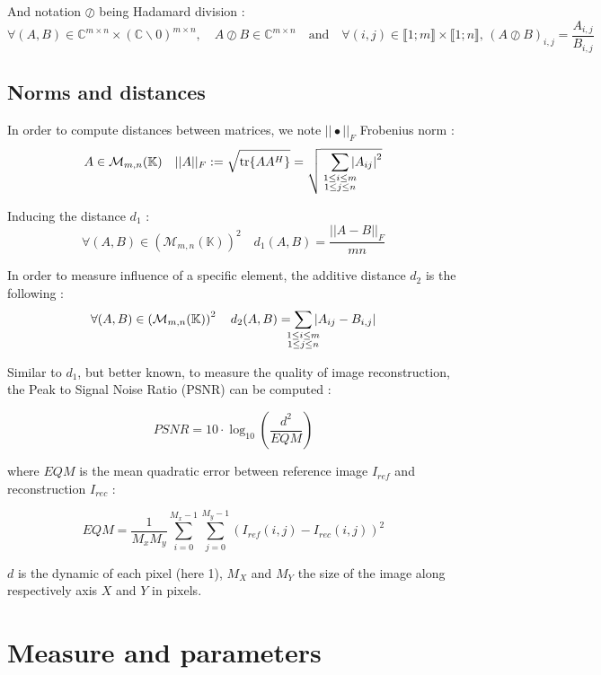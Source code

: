 \documentclass[titlepage,11pt]{article}
\newcommand{\fnorm}[1]{|\vert#1|\vert_{F}} %
\begin{document}
	And notation $\oslash$ being Hadamard division :
	$$
	\forall (A,B)\in\mathbb{C}^{m\times n}\times\left(\mathbb{C}\backslash0\right)^{m\times n}, \quad A\oslash B\in\mathbb{C}^{m\times n} \quad\text{and}\quad \forall (i,j)\in\llbracket1;m\rrbracket\times\llbracket1;n\rrbracket,\, (A\oslash B)_{i,j} = \frac{A_{i,j}}{B_{i,j}}
	$$
	
	\subsection{Norms and distances}
	
	In order to compute distances between matrices, we note $\fnorm{\bullet}$ Frobenius norm :
	$$
	A\in\mathcal{M}_{m,n}(\mathbb{K}) \quad \fnorm{A} := \sqrt{\tr{AA^H}} = \sqrt{
		\;\;\;\sum_{
			\mathclap{
				\substack{
					1\le i\le m \\1\le j\le n
				}
			}
		}\abs{A_{ij}}^2}
	$$
	
	Inducing the distance $d_1$ :
	$$
	\forall(A,B)\in\left(\mathcal{M}_{m,n}(\mathbb{K})\right)^2\quad d_1(A,B) = \frac{\fnorm{A-B}}{mn}
	$$
	
	In order to measure influence of a specific element, the additive distance $d_2$ is the following :
	$$
	\forall(A,B)\in\left(\mathcal{M}_{m,n}(\mathbb{K})\right)^2\quad d_2(A,B) = \sum_{
		\mathclap{
			\substack{
				1\le i\le m \\1\le j\le n
			}
		}
	}\abs{A_{ij} - B_{i,j}}
	$$
	
	Similar to $d_1$, but better known, to measure the quality of image reconstruction, the Peak to Signal Noise Ratio (PSNR) can be computed :
	
	$$
		PSNR = 10\cdot\log_{10}\left(\frac{d^2}{EQM}\right)
	$$
	
	where $EQM$ is the mean quadratic error between reference image $I_{ref}$ and reconstruction $I_{rec}$ :
	
	$$
		EQM = \frac{1}{M_xM_y}\sum_{i=0}^{M_x-1}\sum_{j=0}^{M_y-1}( I_{ref}(i,j) - I_{rec}(i,j) )^2
	$$
	
	$d$ is the dynamic of each pixel (here 1), $M_X$ and $M_Y$ the size of the image along respectively axis $X$ and $Y$ in pixels. 
	
	\section{Measure and parameters}
	
\end{document}
